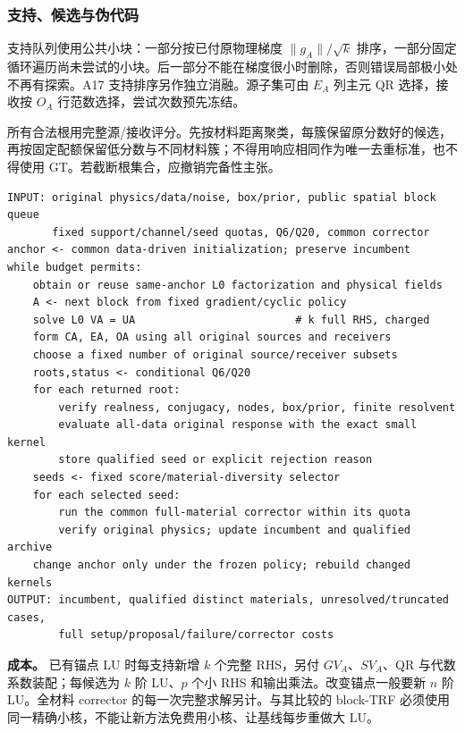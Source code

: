\documentclass[10pt,a4paper]{article}
\begin{document}
\hypertarget{ux652fux6301ux5019ux9009ux4e0eux4f2aux4ee3ux7801}{%
\subsubsection{支持、候选与伪代码}\label{ux652fux6301ux5019ux9009ux4e0eux4f2aux4ee3ux7801}}

支持队列使用公共小块：一部分按已付原物理梯度 \(\|g_A\|/\sqrt{k}\)
排序，一部分固定循环遍历尚未尝试的小块。后一部分不能在梯度很小时删除，否则错误局部极小处不再有探索。A17
支持排序另作独立消融。源子集可由 \(E_A\) 列主元 QR 选择，接收按 \(O_A\)
行范数选择，尝试次数预先冻结。

所有合法根用完整源/接收评分。先按材料距离聚类，每簇保留原分数好的候选，再按固定配额保留低分数与不同材料簇；不得用响应相同作为唯一去重标准，也不得使用
GT。若截断根集合，应撤销完备性主张。

\begin{verbatim}
INPUT: original physics/data/noise, box/prior, public spatial block queue
       fixed support/channel/seed quotas, Q6/Q20, common corrector
anchor <- common data-driven initialization; preserve incumbent
while budget permits:
    obtain or reuse same-anchor L0 factorization and physical fields
    A <- next block from fixed gradient/cyclic policy
    solve L0 VA = UA                         # k full RHS, charged
    form CA, EA, OA using all original sources and receivers
    choose a fixed number of original source/receiver subsets
    roots,status <- conditional Q6/Q20
    for each returned root:
        verify realness, conjugacy, nodes, box/prior, finite resolvent
        evaluate all-data original response with the exact small kernel
        store qualified seed or explicit rejection reason
    seeds <- fixed score/material-diversity selector
    for each selected seed:
        run the common full-material corrector within its quota
        verify original physics; update incumbent and qualified archive
    change anchor only under the frozen policy; rebuild changed kernels
OUTPUT: incumbent, qualified distinct materials, unresolved/truncated cases,
        full setup/proposal/failure/corrector costs
\end{verbatim}

\textbf{成本。} 已有锚点 LU 时每支持新增 \(k\) 个完整 RHS，另付
\(GV_A\)、\(SV_A\)、QR 与代数系数装配；每候选为 \(k\) 阶 LU、\(p\) 个小
RHS 和输出乘法。改变锚点一般要新 \(n\) 阶 LU。全材料 corrector
的每一次完整求解另计。与其比较的 block-TRF
必须使用同一精确小核，不能让新方法免费用小核、让基线每步重做大 LU。
\end{document}
